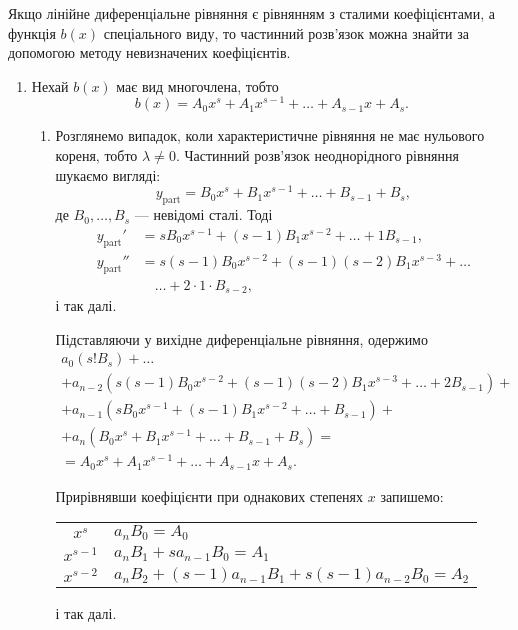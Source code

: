 Якщо лінійне диференціальне рівняння є рівнянням з сталими коефіцієнтами, а функція $b(x)$ спеціального виду, то частинний розв'язок можна знайти за допомогою методу невизначених коефіцієнтів.

\begin{enumerate}
	\item Нехай $b(x)$ має вид многочлена, тобто
	\begin{equation*}
		b(x) = A_0 x^s + A_1 x^{s - 1} + \ldots + A_{s - 1} x + A_s.
	\end{equation*}

	\begin{enumerate}
		\item Розглянемо випадок, коли характеристичне рівняння не має нульового кореня, тобто $\lambda \ne 0$. Частинний розв'язок неоднорідного рівняння шукаємо вигляді:
		\begin{equation*}
			y_{\text{part}} = B_0 x^s + B_1 x^{s - 1} + \ldots + B_{s - 1} + B_s,
		\end{equation*}
		де $B_0, \ldots, B_s$ --- невідомі сталі. Тоді
		\begin{align*}
			y_{\text{part}}' &= s B_0 x^{s - 1} + (s - 1) B_1 x^{s - 2} + \ldots + 1 B_{s - 1}, \\
			y_{\text{part}}'' &= s (s - 1) B_0 x^{s - 2} + (s - 1) (s - 2) B_1 x^{s - 3} + \ldots \\ & \quad \ldots + 2 \cdot 1 \cdot B_{s - 2},
		\end{align*}
		і так далі. \parvskip

		Підставляючи у вихідне диференціальне рівняння, одержимо
		\begin{multline*}
			a_0 \left( s! B_s \right) + \ldots \\ + a_{n - 2} \left( s (s - 1) B_0 x^{s - 2} + (s - 1) (s - 2) B_1 x^{s - 3} + \ldots + 2 B_{s - 1} \right) + \\ + a_{n - 1} \left( s B_0 x^{s - 1} + (s - 1) B_1 x^{s - 2} + \ldots + B_{s - 1} \right) + \\ + a_n \left( B_0 x^s + B_1 x^{s - 1} + \ldots + B_{s - 1} + B_s \right) = \\ = A_0 x^s + A_1 x^{s - 1} + \ldots + A_{s - 1} x + A_s.
		\end{multline*}

		Прирівнявши коефіцієнти при однакових степенях $x$ запишемо: 
		\begin{table}[H]
			\centering
			\begin{tabular}{c|l}
				$x^s$ & $a_n B_0 = A_0$ \\
				$x^{s - 1}$ & $a_n B_1 + s a_{n - 1} B_0 = A_1$ \\
				$x^{s - 2}$ & $a_n B_2 + (s - 1) a_{n - 1} B_1 + s (s - 1) a_{n - 2} B_0 = A_2$
			\end{tabular}
		\end{table}
		і так далі. \parvskip


\end{enumerate}
\end{enumerate}
